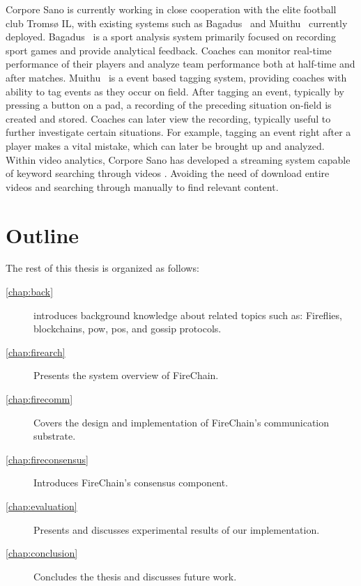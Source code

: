\documentclass[USenglish]{uit-thesis}
\begin{document}
Corpore Sano is currently working in close cooperation with the elite football club Tromsø IL, with existing systems such as Bagadus~\cite{baga, baga2, baga3} and Muithu~\cite{mui, mui2} currently deployed.
Bagadus~\cite{baga, baga2, baga3} is a sport analysis system primarily focused on recording sport games and provide analytical feedback.
Coaches can monitor real-time performance of their players and analyze team performance both at half-time and after matches.
Muithu~\cite{mui, mui2} is a event based tagging system, providing coaches with ability to tag events as they occur on field.
After tagging an event, typically by pressing a button on a pad, a recording of the preceding situation on-field is created and stored.
Coaches can later view the recording, typically useful to further investigate certain situations.
For example, tagging an event right after a player makes a vital mistake, which can later be brought up and analyzed.
Within video analytics, Corpore Sano has developed a streaming system capable of keyword searching through videos \cite{video_dag}.
Avoiding the need of download entire videos and searching through manually to find relevant content.






  
  


\section{Outline}
The rest of this thesis is organized as follows:
\begin{description}
\item[\autoref{chap:back}] introduces background knowledge about related topics such as: Fireflies, blockchains, \gls{pow}, \gls{pos}, and gossip protocols.

\item[\autoref{chap:firearch}] Presents the system overview of FireChain.

\item[\autoref{chap:firecomm}] Covers the design and implementation of FireChain's communication substrate.

\item[\autoref{chap:fireconsensus}] Introduces FireChain's consensus component.

\item[\autoref{chap:evaluation}] Presents and discusses experimental results of our implementation.

\item[\autoref{chap:conclusion}] Concludes the thesis and discusses future work.   
\end{description}
\end{document}
